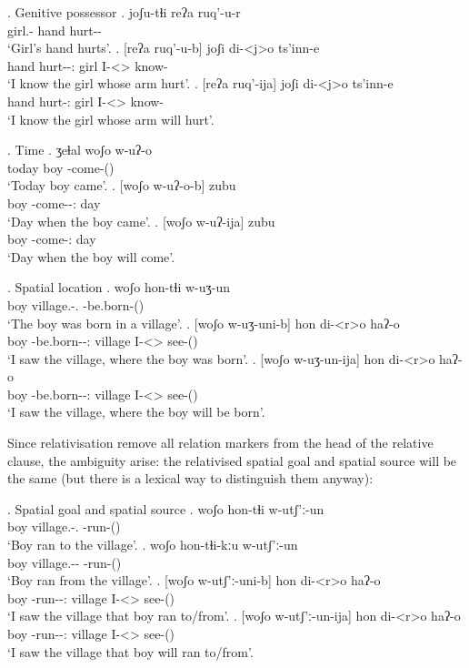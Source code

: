 \ex. Genitive possessor
	\ag. joʃu-tɬi reʔa ruq'-u-r\\
			{girl.\Obl-\Gen} hand {hurt-\Pst-\Prog}\\
			\glt `Girl's hand hurts'.
	\bg. [reʔa ruq'-u-b] joʃi di-<j>o ts'inn-e\\
			hand {hurt-\Pst-\Ptcp:\Pst} girl {I-<\F>\Aff} {know-\Hab}\\
			\glt `I know the girl whose arm hurt'.
	\bg. [reʔa ruq'-ija] joʃi di-<j>o ts'inn-e\\
			hand {hurt-\Ptcp:\Prae} girl {I-<\F>\Aff} {know-\Hab}\\
			\glt `I know the girl whose arm will hurt'.
			
\ex. Time
	\ag. ʒeɬal woʃo w-uʔ-o\\
			today {boy} {\M-come-\Pst(\Aor)}\\
			\glt `Today boy came'.	
	\bg. [woʃo w-uʔ-o-b] zubu\\
			{boy} {\M-come-\Pst-\Ptcp:\Pst} day\\
			\glt `Day when the boy came'.	
	\bg. [woʃo w-uʔ-ija] zubu\\
			{boy} {\M-come-\Ptcp:\Prae} day\\
			\glt `Day when the boy will come'.	

\ex. Spatial location
	\ag. woʃo hon-tɬi w-uʒ-un\\
			boy {village.\Obl-\Inter.\Ess} {\M-be.born-\Pst(\Aor)}\\
			\glt `The boy was born in a village'.
	\bg. [woʃo w-uʒ-uni-b] hon di-<r>o haʔ-o\\
			boy {\M-be.born-\Pst-\Ptcp:\Pst} village {I-<\Nans>\Aff} {see-\Pst(\Aor)}\\
			\glt `I saw the village, where the boy was born'.
	\bg. [woʃo w-uʒ-un-ija] hon di-<r>o haʔ-o\\
			boy {\M-be.born-\Npst-\Ptcp:\Prae} village {I-<\Nans>\Aff} {see-\Pst(\Aor)}\\
			\glt `I saw the village, where the boy will be born'.
			
Since relativisation remove all relation markers from the head of the relative clause, the ambiguity arise: the relativised spatial goal and spatial source will be the same (but there is a lexical way to distinguish them anyway):

\ex. Spatial goal and spatial source
	\ag. woʃo hon-tɬi w-utʃ'ː-un\\
			boy {village.\Obl-\Inter.\Lat} {\M-run-\Pst(\Aor)}\\
			\glt `Boy ran to the village'.
	\bg. woʃo hon-tɬi-kːu w-utʃ'ː-un\\
			boy {village.\Obl-\Inter-\Elat} {\M-run-\Pst(\Aor)}\\
			\glt `Boy ran from the village'.
	\bg. [woʃo w-utʃ'ː-uni-b] hon di-<r>o haʔ-o\\
			boy {\M-run-\Pst-\Ptcp:\Pst} village {I-<\Nans>\Aff} {see-\Pst(\Aor)}\\
			\glt `I saw the village that boy ran to/from'.
	\bg. [woʃo w-utʃ'ː-un-ija] hon di-<r>o haʔ-o\\
			boy {\M-run-\Npst-\Ptcp:\Prae} village {I-<\Nans>\Aff} {see-\Pst(\Aor)}\\
			\glt `I saw the village that boy will ran to/from'.

